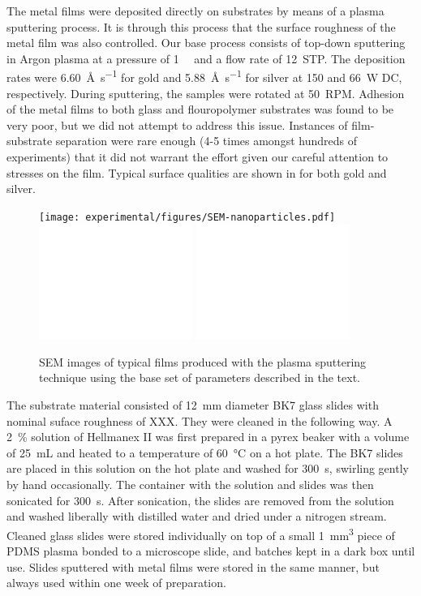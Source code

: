 The metal films were deposited directly on substrates by means of a plasma
sputtering process.  It is through this process that the surface roughness
of the metal film was also controlled.  Our base process consists of
top-down sputtering in Argon plasma at a pressure of \SI{1}{\milli\torr}
and a flow rate of \SI{12}{STP}.  The deposition rates were
\SI{6.60}{\angstrom\per\second} for gold and
\SI{5.88}{\angstrom\per\second} for silver at 150 and \SI{66}{\watt} DC,
respectively.  During sputtering, the samples were rotated at \SI{50}{RPM}.
Adhesion of the metal films to both glass and flouropolymer substrates was
found to be very poor, but we did not attempt to address this issue.
Instances of film-substrate separation were rare enough (4-5 times amongst
hundreds of experiments) that it did not warrant the effort given our
careful attention to stresses on the film.  Typical surface qualities are
shown in  for both gold and silver.  
\begin{figure}
\centering
\texttt{[image: experimental/figures/SEM-nanoparticles.pdf]}
\includegraphics[keepaspectratio,width=5cm]{experimental/figures/SEM-holesa.pdf}
\includegraphics[keepaspectratio,width=5cm]{experimental/figures/SEM-holesb.pdf}
\caption{SEM images of typical films produced with the plasma sputtering
technique using the base set of parameters described in the text.}
\label{fig:semsputter}
\end{figure}

The substrate material consisted of \SI{12}{\milli\meter} diameter BK7
glass slides with nominal suface roughness of XXX.  They were cleaned in
the following way.  A \SI{2}{\percent} solution of Hellmanex II was first
prepared in a pyrex beaker with a volume of \SI{25}{\milli\liter} and
heated to a temperature of \SI{60}{\celsius} on a hot plate.  The BK7
slides are placed in this solution on the hot plate and washed for
\SI{300}{\second}, swirling gently by hand occasionally.  The container
with the solution and slides was then sonicated for \SI{300}{\second}.
After sonication, the slides are removed from the solution and washed
liberally with distilled water and dried under a nitrogen stream.  Cleaned
glass slides were stored individually on top of a small
\SI{1}{\milli\meter\cubed} piece of PDMS plasma bonded to a microscope
slide, and batches kept in a dark box until use.  Slides sputtered with
metal films were stored in the same manner, but always used within one week
of preparation.

